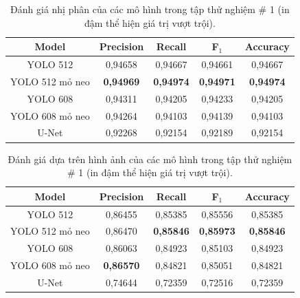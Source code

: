 \documentclass[../the.tex]{subfiles}
\begin{document}
\begin{table}[ht!]
\centering
\caption{Đánh giá nhị phân của các mô hình trong tập thử nghiệm \# 1 (in đậm thể hiện giá trị vượt trội).}
\begin{tabular}{|c|c|c|c|c|}
\hline
\textbf{Model}
& \textbf{Precision}
& \textbf{Recall}  
& \textbf{F$_{1}$} 
& \textbf{Accuracy} 
\\ \hline 
YOLO 512           & 0,94658       & 0,94667   & 0,94661    & 0,94667     \\  \hline
YOLO 512 mỏ neo   & \textbf{0,94969}       & \textbf{0,94974}   & \textbf{0,94971}    & \textbf{0,94974}     \\  \hline
YOLO 608           & 0,94311       & 0,94205   & 0,94233    & 0,94205     \\  \hline
YOLO 608 mỏ neo   & 0,94264       & 0,94103   & 0,94139    & 0,94103     \\  \hline
U-Net              & 0,92268       & 0,92154   & 0,92189    & 0,92154     \\  \hline

\end{tabular}
\label{tab:binary}

\end{table}


\begin{table}[h!]
\centering
\caption{Đánh giá dựa trên hình ảnh của các mô hình trong tập thử nghiệm \# 1 (in đậm thể hiện giá trị vượt trội).}
\begin{tabular}{|c|c|c|c|c|}
\hline
\textbf{Model}
& \textbf{Precision}
& \textbf{Recall}  
& \textbf{F$_{1}$} 
& \textbf{Accuracy} 
\\ \hline 
YOLO 512           & 0,86455       & 0,85385   & 0,85556    & 0,85385     \\  \hline
YOLO 512 mỏ neo   & 0,86470       & \textbf{0,85846}   & \textbf{0,85973}    & \textbf{0,85846}     \\  \hline
YOLO 608           & 0,86063       & 0,84923   & 0,85103    & 0,84923     \\  \hline
YOLO 608 mỏ neo   & \textbf{0,86570}       & 0,84821   & 0,85051    & 0,84821     \\  \hline
U-Net              & 0,74644       & 0,72359   & 0,72516    & 0,72359     \\  \hline


\end{tabular}
\label{tab:image}
\end{table}
\end{document}
